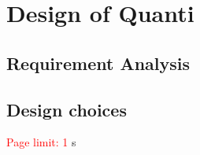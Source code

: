 \section{Design of Quanti}\label{sec:design}

\subsection{Requirement Analysis}

\subsection{Design choices}

\textcolor{red}{Page limit: 1}
 s